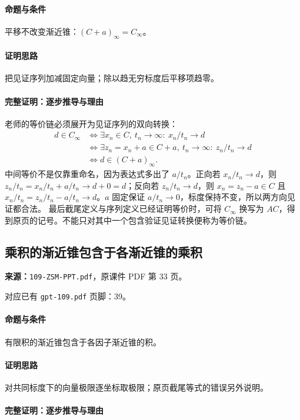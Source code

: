 \paragraph{命题与条件}平移不改变渐近锥：$(C+a)_\infty=C_\infty$。
\paragraph{证明思路}把见证序列加减固定向量；除以趋无穷标度后平移项趋零。
\paragraph{完整证明：逐步推导与理由}

老师的等价链必须展开为见证序列的双向转换：
\begin{align*}
d\in C_\infty
&\iff\exists x_n\in C,\ t_n\to\infty:\ x_n/t_n\to d\\
&\iff\exists z_n=x_n+a\in C+a,\ t_n\to\infty:\ z_n/t_n\to d\\
&\iff d\in(C+a)_\infty.
\end{align*}
中间等价不是仅靠重命名，因为表达式多出了 $a/t_n$。正向若 $x_n/t_n\to d$，则 $z_n/t_n=x_n/t_n+a/t_n\to d+0=d$；反向若 $z_n/t_n\to d$，则 $x_n=z_n-a\in C$ 且 $x_n/t_n=z_n/t_n-a/t_n\to d$。$a$ 固定保证 $a/t_n\to0$，标度保持不变，所以两方向见证都合法。
最后截尾定义与序列定义已经证明等价时，可将 $C_\infty$ 换写为 $AC$，得到原页的记号。不能只对其中一个包含验证见证转换便称为等价链。

\clearpage\subsection{乘积的渐近锥包含于各渐近锥的乘积}
\textbf{来源：}\texttt{109-ZSM-PPT.pdf}，原课件 PDF 第 33 页。\par
对应已有 \texttt{gpt-109.pdf} 页脚：39。\par
\paragraph{命题与条件}有限积的渐近锥包含于各因子渐近锥的积。
\paragraph{证明思路}对共同标度下的向量极限逐坐标取极限；原页截尾等式的错误另外说明。
\paragraph{完整证明：逐步推导与理由}

